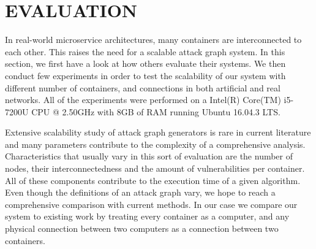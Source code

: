 \section{EVALUATION}

In real-world microservice architectures, many containers are interconnected to each other. This raises the need for a scalable attack graph system. In this section, we first have a look at how others evaluate their systems. We then conduct few experiments in order to test the scalability of our system with different number of containers, and connections in both artificial and real networks. All of the experiments were performed on a Intel(R) Core(TM) i5-7200U CPU @ 2.50GHz with 8GB of RAM running Ubuntu 16.04.3 LTS.

Extensive scalability study of attack graph generators  is rare in current literature and many parameters contribute to the complexity of a comprehensive analysis. Characteristics that usually vary in this sort of evaluation are the number of nodes, their interconnectedness and the amount of vulnerabilities per container. All of these components contribute to the execution time of a given algorithm. Even though the definitions of an attack graph vary, we hope to reach a comprehensive comparison with current methods. In our case we compare our system to existing work by treating every container as a computer, and any physical connection between two computers as a connection between two containers. 

